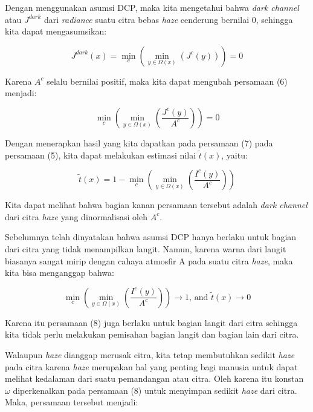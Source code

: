 \documentclass[11pt, a4paper, final]{report}
\begin{document}
Dengan menggunakan asumsi DCP, maka kita mengetahui bahwa \textit{dark channel} atau $J^{dark}$ dari \textit{radiance} suatu citra bebas \textit{haze} cenderung bernilai 0, sehingga kita dapat mengasumsikan:

\begin{equation} \label{eq6}
J^{dark}(x)=\min_c{(\min_{y\in{\Omega(x)}}{(J^c(y))})}=0
\end{equation}

Karena $A^c$ selalu bernilai positif, maka kita dapat mengubah persamaan (6) menjadi:

\begin{equation} \label{eq7}
\min_c{(\min_{y\in{\Omega(x)}}{(\dfrac{J^c(y)}{A^c})})}=0
\end{equation}

Dengan menerapkan hasil yang kita dapatkan pada persamaan (7) pada persamaan (5), kita dapat melakukan estimasi nilai $\tilde{t}(x)$, yaitu:

\begin{equation} \label{eq8}
\tilde{t}(x)=1-\min_c{(\min_{y\in{\Omega(x)}}{(\dfrac{I^c(y)}{A^c})})}
\end{equation}

Kita dapat melihat bahwa bagian kanan persamaan tersebut adalah \textit{dark channel} dari citra \textit{haze} yang dinormalisasi oleh $A^c$.

Sebelumnya telah dinyatakan bahwa asumsi DCP hanya berlaku untuk bagian dari citra yang tidak menampilkan langit. Namun, karena warna dari langit biasanya sangat mirip dengan cahaya atmosfir A pada suatu citra \textit{haze}, maka kita bisa menganggap bahwa:

\begin{equation} \label{eq9}
\min_c{(\min_{y\in{\Omega(x)}}{(\dfrac{I^c(y)}{A^c})})} \rightarrow 1 \text{, and }\tilde{t}(x) \rightarrow 0
\end{equation}

Karena itu persamaan (8) juga berlaku untuk bagian langit dari citra sehingga kita tidak perlu melakukan pemisahan bagian langit dan bagian lain dari citra.

Walaupun \textit{haze} dianggap merusak citra, kita tetap membutuhkan sedikit \textit{haze} pada citra karena \textit{haze} merupakan hal yang penting bagi manusia untuk dapat melihat kedalaman dari suatu pemandangan atau citra. Oleh karena itu konstan $\omega$ diperkenalkan pada persamaan (8) untuk menyimpan sedikit \textit{haze} dari citra. Maka, persamaan tersebut menjadi:
\end{document}
